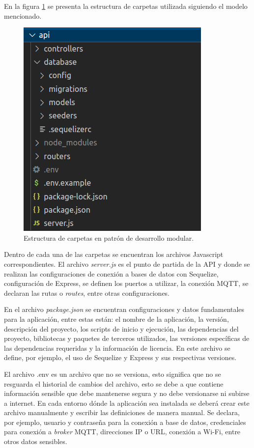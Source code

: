 En la figura \ref{fig:apiestructura} se presenta la estructura de carpetas utilizada siguiendo el modelo mencionado. 

\begin{figure}[ht]
	\centering
	\includegraphics[scale=.50]{./Figures/api-estructura-archivos.png}
	\caption{Estructura de carpetas en patrón de desarrollo modular.}
	\label{fig:apiestructura}
\end{figure}

Dentro de cada una de las carpetas se encuentran los archivos Javascript correspondientes. El archivo \textit{server.js} es el punto de partida de la API y donde se realizan las configuraciones de conexión a bases de datos con Sequelize, configuración de Express, se definen los puertos a utilizar, la conexión MQTT, se declaran las rutas o \textit{routes}, entre otras configuraciones.

En el archivo \textit{package.json} se encuentran configuraciones y datos fundamentales para la aplicación, entre estas están: el nombre de la aplicación, la versión, descripción del proyecto, los scripts de inicio y ejecución, las dependencias del proyecto, bibliotecas y paquetes de terceros utilizados, las versiones específicas de las dependencias requeridas y la información de licencia. En este archivo se define, por ejemplo, el uso de Sequelize y Express y sus respectivas versiones.

El archivo .env es un archivo que no se versiona, esto significa que no se resguarda el historial de cambios del archivo, esto se debe a que contiene información sensible que debe mantenerse segura y no debe versionarse ni subirse a internet. En cada entorno dónde la aplicación sea instalada se deberá crear este archivo manualmente y escribir las definiciones de manera manual. Se declara, por ejemplo, usuario y contraseña para la conexión a base de datos, credenciales para conexión a \textit{broker} MQTT, direcciones IP o URL, conexión a Wi-Fi, entre otros datos sensibles.

